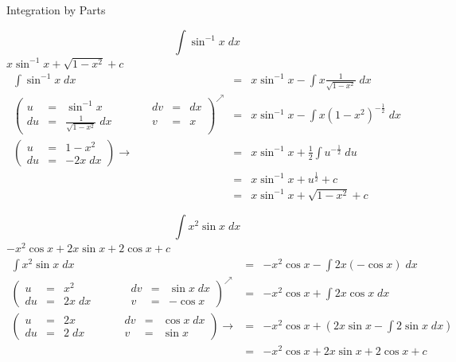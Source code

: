 \documentclass{article}
\begin{document}
\begin{category}{Integration by Parts}
  \begin{clue}
    \[ \int \sin^{-1} x \; dx \]
  \response
    $x\sin^{-1} x + \sqrt{1-x^{2}} + c$
  \solution
    \[
    \begin{array}{rcl}
    {\displaystyle \int \sin^{-1} x \; dx} & = & {\displaystyle x\sin^{-1} x - \int x \frac{1}{\sqrt{1-x^{2}}} \; dx} \\
    \left( \begin{array}{rclcrcl}
    u & = & {\displaystyle \sin^{-1} x} & \qquad & dv & = & dx \\
    du & = & {\displaystyle \frac{1}{\sqrt{1-x^{2}}} \; dx} & \qquad & v & = & x
    \end{array} \right)^{\nearrow} & = & {\displaystyle x\sin^{-1} x - \int x (1-x^{2})^{-\frac{1}{2}} \; dx} \\
    \left( \begin{array}{rcl}
    u & = & {\displaystyle 1-x^{2}} \\
    du & = & {\displaystyle -2x \; dx}
    \end{array} \right) \rightarrow
     & = & {\displaystyle x\sin^{-1} x + \frac{1}{2} \int u^{-\frac{1}{2}} \; du}  \\
     & = & {\displaystyle x\sin^{-1} x + u^{\frac{1}{2}}  + c} \\
     & = & {\displaystyle x\sin^{-1} x + \sqrt{1-x^{2}}  + c}
    \end{array}
    \]
  \end{clue}

  \begin{clue}
    \[ \int x^{2} \sin x \; dx \]
  \response
    $-x^{2} \cos x + 2x \sin x + 2 \cos x + c$
  \solution
    \[
    \begin{array}{rcl}
    {\displaystyle \int x^{2} \sin x \; dx} & = & {\displaystyle -x^{2} \cos x - \int 2x (-\cos x) \; dx} \\
    \left( \begin{array}{rclcrcl}
    u & = & {\displaystyle x^{2}} & \qquad & dv & = & \sin x\; dx \\
    du & = & 2x\; dx & \qquad & v & = & -\cos x
    \end{array} \right)^{\nearrow} & = & {\displaystyle -x^{2} \cos x + \int 2x \cos x \; dx} \\
    \left( \begin{array}{rclcrcl}
    u & = & 2x & \qquad & dv & = & \cos x\; dx \\
    du & = & 2\; dx & \qquad & v & = & \sin x
    \end{array} \right) \rightarrow & = & {\displaystyle -x^{2} \cos x + \left( 2x \sin x - \int 2 \sin x \; dx \right)} \\
     & = & {\displaystyle -x^{2} \cos x + 2x \sin x + 2 \cos x + c}
    \end{array}
    \]
  \end{clue}

\end{category}
\end{document}
